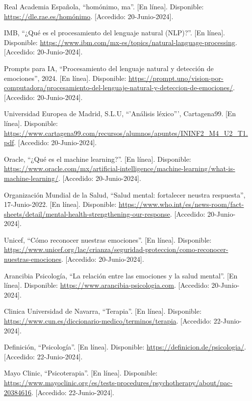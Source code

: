 \documentclass[12pt,twoside]{article}
\begin{document}
\begin{thebibliography}{10}
	Real Academia Española, ``homónimo, ma''. [En línea]. Disponible: \url{https://dle.rae.es/homónimo}. [Accedido: 20-Junio-2024].
	
	IMB, ``¿Qué es el procesamiento del lenguaje natural (NLP)?''. [En línea]. Disponible: \url{https://www.ibm.com/mx-es/topics/natural-language-processing}. [Accedido: 20-Junio-2024].
	
	Prompts para IA, ``Procesamiento del lenguaje natural y detección de emociones'', 2024. [En línea]. Disponible: \url{https://prompt.uno/vision-por-computadora/procesamiento-del-lenguaje-natural-y-deteccion-de-emociones/}. [Accedido: 20-Junio-2024].
	
	Universidad Europea de Madrid, S.L.U, ``'Análisis léxico''', Cartagena99. [En línea]. Disponible: \url{https://www.cartagena99.com/recursos/alumnos/apuntes/ININF2_M4_U2_T1.pdf}. [Accedido: 20-Junio-2024].
	
	Oracle, ``¿Qué es el machine learning?''. [En línea]. Disponible: \url{https://www.oracle.com/mx/artificial-intelligence/machine-learning/what-is-machine-learning/}. [Accedido: 20-Junio-2024].
	
	Organización Mundial de la Salud, ``Salud mental: fortalecer neustra respuesta'', 17-Junio-2022. [En línea]. Disponible: \url{https://www.who.int/es/news-room/fact-sheets/detail/mental-health-strengthening-our-response}. [Accedido: 20-Junio-2024].
	
	Unicef, ``Cómo reconocer nuestras emociones''. [En línea]. Disponible: \url{https://www.unicef.org/lac/crianza/seguridad-proteccion/como-reconocer-nuestras-emociones}. [Accedido: 20-Junio-2024].
	
	Arancibia Psicología, ``La relación entre las emociones y la salud mental''. [En línea]. Disponible: \url{https://www.arancibia-psicologia.com}. [Accedido: 20-Junio-2024].
	
	Clinica Universidad de Navarra, ``Terapia''. [En línea]. Disponible: \url{https://www.cun.es/diccionario-medico/terminos/terapia}. [Accedido: 22-Junio-2024].
	
	Definición, ``Psicología''. [En línea]. Disponible: \url{https://definicion.de/psicologia/}. [Accedido: 22-Junio-2024].
	
	Mayo Clinic, ``Psicoterapia''. [En línea]. Disponible: \url{https://www.mayoclinic.org/es/tests-procedures/psychotherapy/about/pac-20384616}. [Accedido: 22-Junio-2024].
	

\end{thebibliography}
\end{document}
